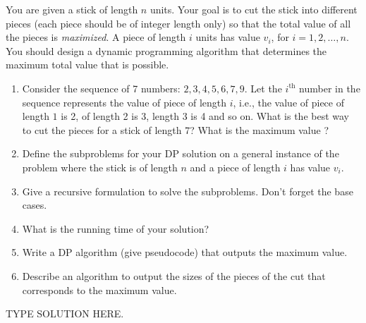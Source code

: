 \documentclass[final]{article}
\begin{document}
\begin{exercise}{6.20}

    You are given a stick of length $n$ units. Your goal is to cut the stick into different pieces (each piece should be of integer length only) so that the total value of all the pieces is \emph{maximized}. A piece of length $i$ units has value $v_i$, for $i = 1, 2, \dots, n$. You should design a dynamic programming algorithm that determines the maximum total value that is possible.
    \begin{enumerate}[label=(\roman*)]
        \item Consider the sequence of 7 numbers: $2,3,4,5,6,7,9$. Let the $i^{\text{th}}$ number in the sequence represents the value of piece of length $i$, i.e., the value of piece of length $1$ is 2, of length 2 is 3, length 3 is 4 and so on. What is the best way to cut the pieces for a stick of length 7? What is the maximum value ?
        \item Define the subproblems for your DP solution on a general instance of the problem where the stick is of length $n$ and a piece of length $i$ has value $v_i$.
        \item Give a recursive formulation to solve the subproblems. Don't forget the base cases.
        \item What is the running time of your solution?
        \item Write a DP algorithm (give pseudocode) that outputs the maximum value.
        \item Describe an algorithm to output the sizes of the pieces of the cut that corresponds to the maximum value.
    \end{enumerate}
\end{exercise}

\begin{solution}
    TYPE SOLUTION HERE.
\end{solution}
\end{document}
